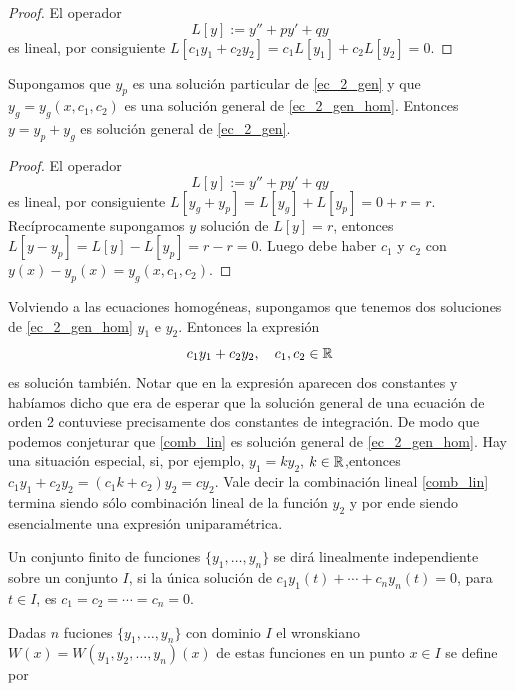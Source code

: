 \begin{proof}
 El operador
\[L[y]:=y''+py'+qy\]
es lineal, por consiguiente
$L[c_1y_1+c_2y_2]=c_1L[y_1]+c_2L[y_2]=0.$
\end{proof}


\begin{teorema}
 Supongamos que $y_p$ es una solución particular de \eqref{ec_2_gen} y que $y_g=y_g(x,c_1,c_2)$ es una solución
general de \eqref{ec_2_gen_hom}. Entonces $y=y_p+y_g$ es solución general de \eqref{ec_2_gen}.
\end{teorema}



\begin{proof}
El operador
\[L[y]:=y''+py'+qy\]
es lineal, por consiguiente
$L[y_g+y_p]=L[y_g]+L[y_p]=0+r=r.$
Recíprocamente supongamos $y$ solución de $L[y]=r$, entonces
$L[y-y_p]=L[y]-L[y_p]=r-r=0.$
Luego debe haber $c_1$ y $c_2$ con $y(x)-y_p(x)=y_g(x,c_1,c_2)$.

\end{proof}


Volviendo a las ecuaciones homogéneas, supongamos que tenemos dos soluciones de \eqref{ec_2_gen_hom} $y_1$ e $y_2$. Entonces la expresión
\begin{equation}\label{comb_lin}
c_1y_1+c_2y_2,\quad c_1,c_2\in\mathbb{R}
\end{equation}
es solución también. Notar que en la expresión aparecen dos constantes y habíamos dicho que era de esperar que la solución general de una ecuación de orden 2 contuviese
precisamente dos constantes de integración. De modo que podemos conjeturar que \eqref{comb_lin} es solución general de \eqref{ec_2_gen_hom}.
Hay una situación especial, si, por ejemplo, $y_1=ky_2$, $k\in\mathbb{R}$,entonces $c_1y_1+c_2y_2=(c_1k+c_2)y_2=cy_2$. Vale decir la combinación lineal \eqref{comb_lin}
termina siendo sólo combinación lineal de la función $y_2$ y por ende siendo esencialmente una expresión uniparamétrica.

\begin{definicion}
 Un conjunto finito de funciones $\{y_1,\ldots,y_n\}$ se dirá linealmente independiente sobre un conjunto $I$,
si la única solución de $c_1y_1(t)+\cdots+c_ny_n(t)=0$, para $t\in I$, es $c_1=c_2=\cdots=c_n=0$.
\end{definicion}




\begin{definicion}
 Dadas $n$ fuciones $\{y_1,\ldots,y_n\}$ con dominio $I$ el wronskiano $W(x)=W(y_1,y_2,\ldots,y_n)(x)$ de estas funciones en un punto $x\in I$ se define por
\end{definicion}




